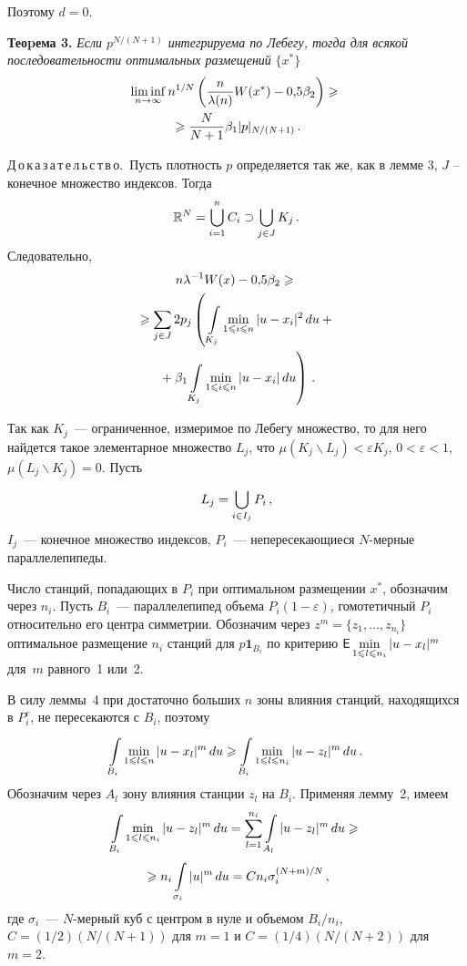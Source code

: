 \begin{multicols}{2}
Поэтому $d=0$.  \qquad  %


\medskip

\noindent
\textbf{Теоpема 3.} {\it Если $p^{N/(N+1)}$ интегрируема по Лебегу, тогда для всякой
последовательности оптимальных размещений} $\{x^*\}$
\begin{multline*}
\liminf\limits_{n\rightarrow
\infty}n^{1/N}\left(\displaystyle\frac{\displaystyle n\mathstrut}{\displaystyle \lambda(n)\mathstrut}W(x^*)-0{,}5\beta_2\right)\geqslant{}\\
{}\geqslant
\displaystyle\frac{\displaystyle N\mathstrut}{\displaystyle N+1\mathstrut} \beta_1 |p|_{N/(N+1)}\,.
\end{multline*}

\smallskip
Д\,о\,к\,а\,з\,а\,т\,е\,л\,ь\,с\,т\,в\,о.~Пусть плотность $p$ определяется так же, как в лемме 3, $J$
-- конечное множество индексов. Тогда
$$
{\mathbb{R}}^N=\bigcup\limits_{i=1}^{n}C_i\supset \bigcup\limits_{j\in J}^{}K_j\,.
$$
Следовательно,
\begin{multline*}
n\lambda^{-1}W(x)-0{,}5\beta_2\geqslant {}\\
{}\geqslant
\sum\limits_{j\in J}^{}2p_j \left(\, \int\limits_{K_j}^{}\min\limits_{1\leqslant i\leqslant n}|u-x_i|^2\,du +{}\right.\\
\left.{}+\beta_1 \int\limits_{K_j}^{}\min\limits_{1\leqslant i\leqslant n}|u-x_i|\,du
\right)\,.
\end{multline*}

Так как $K_j$~--- ограниченное, измеримое по Лебегу множество, то для него найдется такое
элементарное множество $L_j$, что $\mu(K_j\backslash L_j)<\varepsilon K_j$, $0<\varepsilon <1$,
$\mu(L_j\backslash K_j)=0$.  Пусть
$$
L_j=\bigcup\limits_{i\in I_j}^{}P_i\,,
$$
$I_j$~--- конечное множество
индексов, $P_i$~--- непересекающиеся $N$-мерные параллелепипеды.

Число станций, попадающих в $P_i$ при оптимальном размещении $x^*$, обозначим через
$n_i$. Пусть $B_i$~--- параллелепипед объема $P_i(1-\varepsilon)$, гомотетичный $P_i$
относительно его центра симметрии. Обозначим через
$z^m=\{z_1,\dots,z_{n_i}\}$ оптимальное
размещение $n_i$ станций для $p \textbf{1}_{B_i}$ по критерию
${{\sf E}}\min\limits_{1\leqslant l\leqslant n_i}|u-x_l|^m$ для~$m$ равного~1 или~2.

В силу леммы~4 при достаточно больших $n$ зоны влияния станций, находящихся в $P_i^c$, не
пересекаются с $B_i$, поэтому
$$
\int\limits_{B_i}^{}\min\limits_{1\leqslant l\leqslant n}|u-x_l|^m\,du \geqslant \int\limits_{B_i}^{}\min\limits_{1\leqslant l\leqslant n_i}|u-z_l|^m\,du\,.
$$
Обозначим через $A_l$ зону влияния станции $z_l$ на $B_i$.
Применяя лемму~2, имеем
\begin{multline*}
\int\limits_{B_i}^{}\min\limits_{1\leqslant l\leqslant n_i}|u-z_l|^m\,du
=\sum\limits_{l=1}^{n_i}\int\limits_{A_l}^{}|u-z_l|^m\,du \geqslant {}\\
{}\geqslant
n_i \int\limits_{\sigma_i}^{}|u|^m\,du=C n_i \sigma_i^{(N+m)/N}\,,
\end{multline*}
где $\sigma_i$~--- $N$-мерный куб с центром в нуле и объемом $B_i/n_i$, $C=(1/2)(N/(N+1))$ для
$m=1$ и $C=(1/4) (N/(N+2))$ для $m=2$.


\end{multicols}
